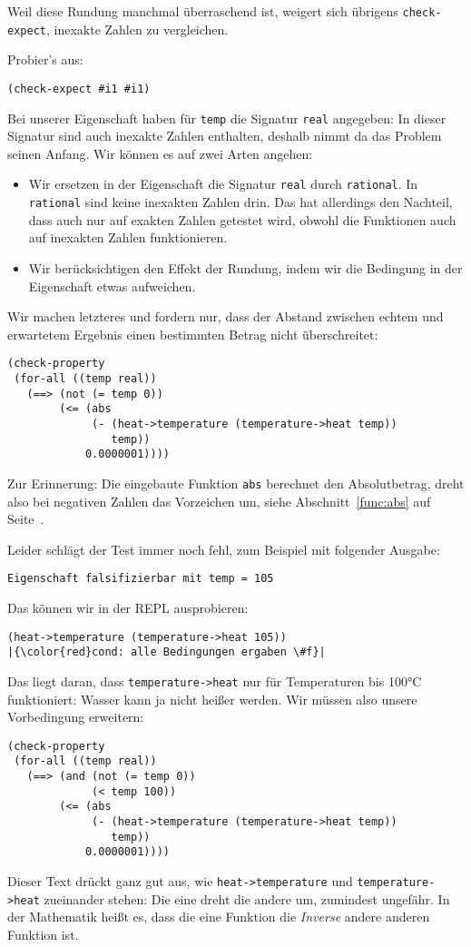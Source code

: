 Weil diese Rundung manchmal überraschend ist, weigert sich übrigens
\lstinline{check-expect}, inexakte Zahlen zu vergleichen.
%
\begin{aufgabeinline}
  Probier's aus:
\begin{lstlisting}
(check-expect #i1 #i1)
\end{lstlisting}
\end{aufgabeinline}
%
Bei unserer Eigenschaft
haben für \lstinline{temp} die Signatur \lstinline{real} angegeben: In
dieser Signatur sind auch inexakte Zahlen enthalten, deshalb nimmt da
das Problem seinen Anfang.  Wir können es auf zwei Arten angehen:
%
\begin{itemize}
\item Wir ersetzen in der Eigenschaft die Signatur \lstinline{real}
  durch \lstinline{rational}.  In \lstinline{rational} sind keine
  inexakten Zahlen drin.  Das hat allerdings den Nachteil, dass auch
  nur auf exakten Zahlen getestet wird, obwohl die Funktionen auch auf
  inexakten Zahlen funktionieren.
\item Wir berücksichtigen den Effekt der Rundung, indem wir die Bedingung
  in der Eigenschaft etwas aufweichen.
\end{itemize}
%
Wir machen letzteres und fordern nur, dass der Abstand zwischen echtem
und erwartetem Ergebnis einen bestimmten Betrag nicht überschreitet:
%
\begin{lstlisting}
(check-property
 (for-all ((temp real))
   (==> (not (= temp 0))
        (<= (abs
             (- (heat->temperature (temperature->heat temp))
                temp))
            0.0000001))))
\end{lstlisting}
%
Zur Erinnerung: Die eingebaute Funktion \lstinline{abs} berechnet den
Absolutbetrag, dreht also bei negativen Zahlen das Vorzeichen um,
siehe Abschnitt~\ref{func:abs} auf Seite~\pageref{func:abs}.

Leider schlägt der Test immer noch fehl, zum Beispiel mit folgender
Ausgabe:
%
\begin{lstlisting}
Eigenschaft falsifizierbar mit temp = 105
\end{lstlisting}
%
Das können wir in der REPL ausprobieren:
%
\begin{lstlisting}
(heat->temperature (temperature->heat 105))
|{\color{red}cond: alle Bedingungen ergaben \#f}|
\end{lstlisting}
%
Das liegt daran, dass \lstinline{temperature->heat} nur für
Temperaturen bis 100\si{\degree}C funktioniert: Wasser kann ja nicht
heißer werden.  Wir müssen also unsere Vorbedingung erweitern:
%
\begin{lstlisting}
(check-property
 (for-all ((temp real))
   (==> (and (not (= temp 0))
             (< temp 100))
        (<= (abs
             (- (heat->temperature (temperature->heat temp))
                temp))
            0.0000001))))
\end{lstlisting}
%
Dieser Text drückt ganz gut aus, wie \lstinline{heat->temperature} und
\lstinline{temperature->heat} zueinander stehen: Die eine dreht die
andere um, zumindest ungefähr.  In der Mathematik heißt es, dass die
eine Funktion die \textit{Inverse} andere anderen Funktion
ist.

